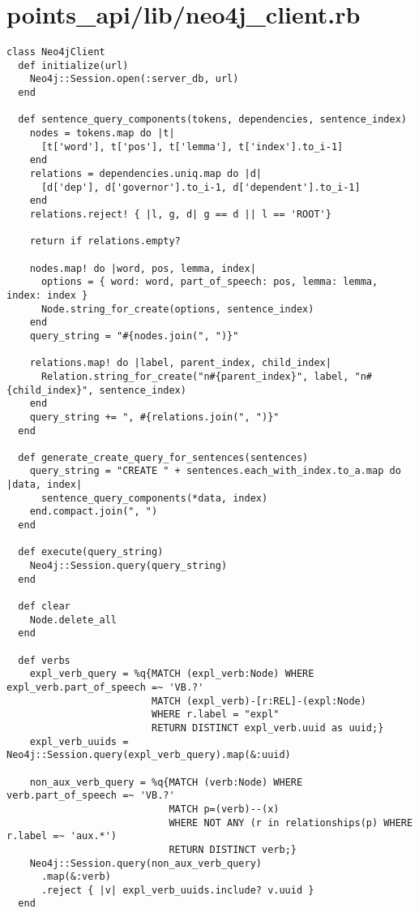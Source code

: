 \documentclass{article}
\begin{document}
\section*{points\_api/lib/neo4j\_client.rb}
\begin{verbatim}
class Neo4jClient
  def initialize(url)
    Neo4j::Session.open(:server_db, url)
  end

  def sentence_query_components(tokens, dependencies, sentence_index)
    nodes = tokens.map do |t|
      [t['word'], t['pos'], t['lemma'], t['index'].to_i-1]
    end
    relations = dependencies.uniq.map do |d|
      [d['dep'], d['governor'].to_i-1, d['dependent'].to_i-1]
    end
    relations.reject! { |l, g, d| g == d || l == 'ROOT'}

    return if relations.empty?

    nodes.map! do |word, pos, lemma, index|
      options = { word: word, part_of_speech: pos, lemma: lemma, index: index }
      Node.string_for_create(options, sentence_index)
    end
    query_string = "#{nodes.join(", ")}"

    relations.map! do |label, parent_index, child_index|
      Relation.string_for_create("n#{parent_index}", label, "n#{child_index}", sentence_index)
    end
    query_string += ", #{relations.join(", ")}"
  end

  def generate_create_query_for_sentences(sentences)
    query_string = "CREATE " + sentences.each_with_index.to_a.map do |data, index|
      sentence_query_components(*data, index)
    end.compact.join(", ")
  end

  def execute(query_string)
    Neo4j::Session.query(query_string)
  end

  def clear
    Node.delete_all
  end

  def verbs
    expl_verb_query = %q{MATCH (expl_verb:Node) WHERE expl_verb.part_of_speech =~ 'VB.?'
                         MATCH (expl_verb)-[r:REL]-(expl:Node)
                         WHERE r.label = "expl"
                         RETURN DISTINCT expl_verb.uuid as uuid;}
    expl_verb_uuids = Neo4j::Session.query(expl_verb_query).map(&:uuid)

    non_aux_verb_query = %q{MATCH (verb:Node) WHERE verb.part_of_speech =~ 'VB.?'
                            MATCH p=(verb)--(x)
                            WHERE NOT ANY (r in relationships(p) WHERE r.label =~ 'aux.*')
                            RETURN DISTINCT verb;}
    Neo4j::Session.query(non_aux_verb_query)
      .map(&:verb)
      .reject { |v| expl_verb_uuids.include? v.uuid }
  end


\end{verbatim}
\end{document}
